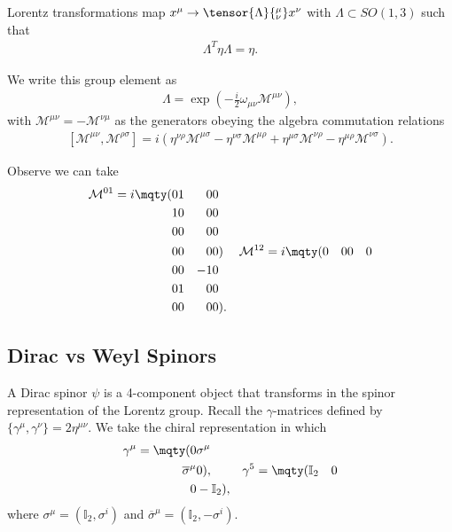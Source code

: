 Lorentz transformations map $x^{\mu} \to \tensor{\Lambda}{^{\mu}_\nu} x^{\nu}$ with $\Lambda \subset SO\left( 1,3 \right) $ such that
\begin{align}
    \Lambda^{T} \eta \Lambda = \eta
.\end{align}

We write this group element as
\begin{align}
    \Lambda = \exp \left( -\frac{i}{2} \omega_{\mu \nu} \mathcal{M}^{\mu \nu} \right) 
,\end{align}
with $\mathcal{M}^{\mu \nu} = - \mathcal{M}^{\nu \mu}$ as the generators obeying the algebra commutation relations
\begin{align}
    \left[ \mathcal{M}^{\mu \nu},  \mathcal{M}^{\rho \sigma} \right] = i \left( \eta^{\nu \rho} \mathcal{M}^{\mu \sigma} - \eta^{\nu \sigma} \mathcal{M}^{\mu \rho} + \eta^{\mu \sigma}  \mathcal{M}^{\nu \rho} - \eta^{\mu \rho} \mathcal{M}^{\nu \sigma} \right) 
.\end{align}

\begin{example}
    Observe we can take
    \begin{align}
        \mathcal{M}^{01} = i \mqty( 0 & 1 & 0 & 0 \\ 1 & 0 & 0 & 0 \\ 0 & 0 & 0 & 0 \\ 0 & 0 & 0 & 0 ) && \mathcal{M}^{12} = i \mqty( 0 & 0 &0 & 0 \\ 0 & 0 & -1 & 0 \\ 0 & 1 & 0 & 0 \\ 0 & 0 & 0 & 0 )
    .\end{align}
\end{example}

\subsection{Dirac vs Weyl Spinors}

A Dirac spinor $\psi$ is a 4-component object that transforms in the spinor representation of the Lorentz group. Recall the $\gamma$-matrices defined by $\{\gamma^{\mu} , \gamma^{\nu}\} = 2 \eta^{\mu \nu}$. We take the chiral representation in which
\begin{align}
    \gamma^{\mu} = \mqty( 0 & \sigma^{\mu} \\ \overline{\sigma}^{\mu} & 0 ), && \gamma^{5} = \mqty(\mathbb{I}_2 & 0 \\ 0 & -\mathbb{I}_2)
,\end{align}
where $\sigma^{\mu} = \left( \mathbb{I}_2, \sigma^{i} \right) $ and $\overline{\sigma}^{\mu} = \left(\mathbb{I}_2 , - \sigma^{i} \right) $.

